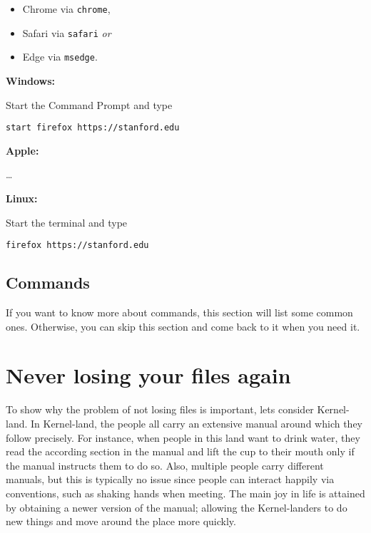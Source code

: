 \documentclass[
  14pt
  american,
  paper=a4,
  ,captions=tableheading
]{scrbook}
\newcommand{\passthrough}[1]{#1}
\providecommand{\tightlist}{%
  \setlength{\itemsep}{0pt}\setlength{\parskip}{0pt}}
\begin{document}
\begin{itemize}
\tightlist
\item
  Chrome via \passthrough{\lstinline!chrome!},
\item
  Safari via \passthrough{\lstinline!safari!} \emph{or}
\item
  Edge via \passthrough{\lstinline!msedge!}.
\end{itemize}

\textbf{Windows:}

Start the Command Prompt and type

\begin{lstlisting}
start firefox https://stanford.edu
\end{lstlisting}

\textbf{Apple:}

\ldots{}

\textbf{Linux:}

Start the terminal and type

\begin{lstlisting}
firefox https://stanford.edu
\end{lstlisting}

\hypertarget{commands}{%
\section{Commands}\label{commands}}

If you want to know more about commands, this section will list some
common ones. Otherwise, you can skip this section and come back to it
when you need it.

\hypertarget{sec:git}{%
\chapter{Never losing your files again}\label{sec:git}}

To show why the problem of not losing files is important, lets consider
Kernel-land. In Kernel-land, the people all carry an extensive manual
around which they follow precisely. For instance, when people in this
land want to drink water, they read the according section in the manual
and lift the cup to their mouth only if the manual instructs them to do
so. Also, multiple people carry different manuals, but this is typically
no issue since people can interact happily via conventions, such as
shaking hands when meeting. The main joy in life is attained by
obtaining a newer version of the manual; allowing the Kernel-landers to
do new things and move around the place more quickly.
\end{document}
